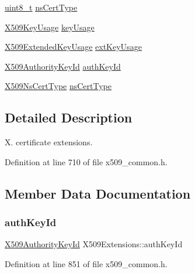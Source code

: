 \begin{DoxyCompactItemize}
\hyperlink{stdint_8h_aba7bc1797add20fe3efdf37ced1182c5}{uint8\+\_\+t} \hyperlink{structX509Extensions_a3600340825a23651f29c87e6da57a4bb}{ns\+Cert\+Type}
\item 
\hyperlink{structX509KeyUsage}{X509\+Key\+Usage} \hyperlink{structX509Extensions_a2769f54833409ab5e6838f6e824b5a2f}{key\+Usage}
\item 
\hyperlink{structX509ExtendedKeyUsage}{X509\+Extended\+Key\+Usage} \hyperlink{structX509Extensions_a2822396916915df0ec3a666c546e02e1}{ext\+Key\+Usage}
\item 
\hyperlink{structX509AuthorityKeyId}{X509\+Authority\+Key\+Id} \hyperlink{structX509Extensions_a3c41096ba469c33d9fed4c090f5713fb}{auth\+Key\+Id}
\item 
\hyperlink{structX509NsCertType}{X509\+Ns\+Cert\+Type} \hyperlink{structX509Extensions_ab20be1138310bed21d365665c6b6e3f0}{ns\+Cert\+Type}
\end{DoxyCompactItemize}


\subsection{Detailed Description}
X. certificate extensions. 

Definition at line 710 of file x509\+\_\+common.\+h.



\subsection{Member Data Documentation}
\mbox{\label{structX509Extensions_a3c41096ba469c33d9fed4c090f5713fb}} 
\subsubsection{\texorpdfstring{auth\+Key\+Id}{authKeyId}}
{\footnotesize\ttfamily \hyperlink{structX509AuthorityKeyId}{X509\+Authority\+Key\+Id} X509\+Extensions\+::auth\+Key\+Id}



Definition at line 851 of file x509\+\_\+common.\+h.

\mbox{\label{structX509Extensions_acc617db6c54f375abf1455a73e2c5ea3}} 
